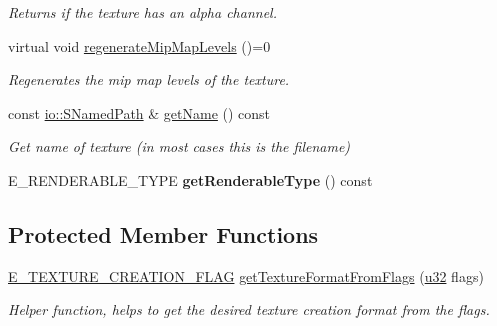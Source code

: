 \begin{DoxyCompactItemize}
\begin{DoxyCompactList}\small\item\em Returns if the texture has an alpha channel. \end{DoxyCompactList}\item 
virtual void \hyperlink{classirr_1_1video_1_1ITexture_a9fdb71df5df36c2113504a883f3b3905}{regenerate\+Mip\+Map\+Levels} ()=0
\begin{DoxyCompactList}\small\item\em Regenerates the mip map levels of the texture. \end{DoxyCompactList}\item 
const \hyperlink{structirr_1_1io_1_1SNamedPath}{io\+::\+S\+Named\+Path} \& \hyperlink{classirr_1_1video_1_1ITexture_acad4f8a4e9b8de5683eebbd7451e2009}{get\+Name} () const \hypertarget{classirr_1_1video_1_1ITexture_acad4f8a4e9b8de5683eebbd7451e2009}{}\label{classirr_1_1video_1_1ITexture_acad4f8a4e9b8de5683eebbd7451e2009}

\begin{DoxyCompactList}\small\item\em Get name of texture (in most cases this is the filename) \end{DoxyCompactList}\item 
E\+\_\+\+R\+E\+N\+D\+E\+R\+A\+B\+L\+E\+\_\+\+T\+Y\+PE {\bfseries get\+Renderable\+Type} () const \hypertarget{classirr_1_1video_1_1ITexture_ad7ec490ad27e951eba9f237c751efdd9}{}\label{classirr_1_1video_1_1ITexture_ad7ec490ad27e951eba9f237c751efdd9}

\end{DoxyCompactItemize}
\subsection*{Protected Member Functions}
\begin{DoxyCompactItemize}
\item 
\hyperlink{namespaceirr_1_1video_acaf6f7414534f7d62bff18c5bf11876f}{E\+\_\+\+T\+E\+X\+T\+U\+R\+E\+\_\+\+C\+R\+E\+A\+T\+I\+O\+N\+\_\+\+F\+L\+AG} \hyperlink{classirr_1_1video_1_1ITexture_afff3160f6aa5f749365ae4f776a440f3}{get\+Texture\+Format\+From\+Flags} (\hyperlink{namespaceirr_a0416a53257075833e7002efd0a18e804}{u32} flags)
\begin{DoxyCompactList}\small\item\em Helper function, helps to get the desired texture creation format from the flags. \end{DoxyCompactList}\end{DoxyCompactItemize}
